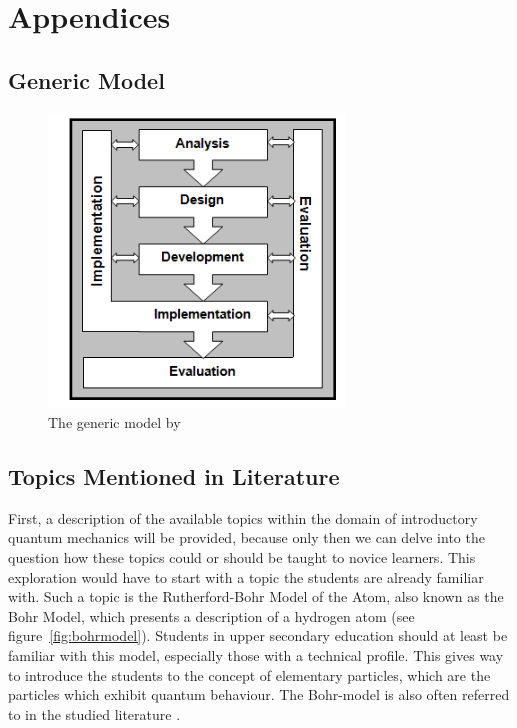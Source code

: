 \documentclass[11pt,twoside]{report} %
\begin{document}



\part{Appendices}

\appendix

\chapter{Generic Model}

\begin{figure}[h]
\centering
\includegraphics[width=0.7\textwidth]{genericmodel}
\caption{The generic model by \protect{}\label{fig:genericmodel}}
\end{figure}

\chapter{Topics Mentioned in Literature}
\label{app:topicsliterature}

First, a description of the available topics within the domain of introductory quantum mechanics will be provided, because only then we can delve into the question how these topics could or should be taught to novice learners. This exploration would have to start with a topic the students are already familiar with. Such a topic is the Rutherford-Bohr Model of the Atom, also known as the Bohr Model, which presents a description of a hydrogen atom (see figure~\ref{fig:bohrmodel}). Students in upper secondary education should at least be familiar with this model, especially those with a technical profile. This gives way to introduce the students to the concept of elementary particles, which are the particles which exhibit quantum behaviour. The Bohr-model is also often referred to in the studied literature \cite{dori, mckagan, muller, papaphotis1, papaphotis2}.
\end{document}
